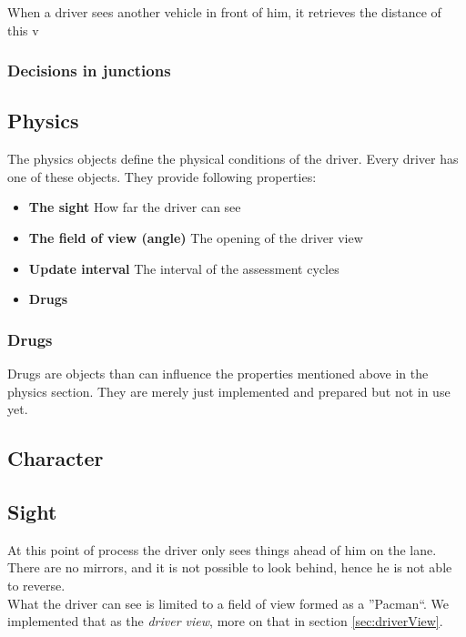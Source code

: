 When a driver sees another vehicle in front of him, it retrieves the distance
of this v

% 

\subsubsection{Decisions in junctions}

\subsection{Physics}
\label{sec:physics}

The physics objects define the physical conditions of the driver. Every
driver has one of these objects. They provide following properties:

\begin{itemize}
\item \textbf{The sight} How far the driver can see
\item \textbf{The field of view (angle)} The opening of the driver view
\item \textbf{Update interval} The interval of the assessment cycles
\item \textbf{Drugs}
\end{itemize}

\subsubsection{Drugs}
\label{sec:drugs}

Drugs are objects than can influence the properties mentioned above in the
physics section. They are merely just implemented and prepared but not 
in use yet.

\subsection{Character}
\label{sec:character}

\subsection{Sight}
\label{sec:sight}

At this point of process the driver only sees things ahead of him on the
lane. There are no mirrors, and it is not possible to look behind, hence
he is not able to reverse.\\

\noindent What the driver can see is limited to a field of view formed as 
a ''Pacman``. We implemented that as the \emph{driver view}, more on that in 
section \ref{sec:driverView}.

